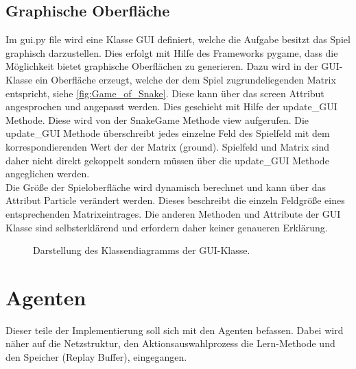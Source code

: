 \subsection{Graphische Oberfläche}
Im gui.py file wird eine Klasse GUI definiert, welche die Aufgabe besitzt das Spiel graphisch darzustellen. Dies erfolgt mit Hilfe des Frameworks pygame, dass die Möglichkeit bietet graphische Oberflächen zu generieren. Dazu wird in der GUI-Klasse ein Oberfläche erzeugt, welche der dem Spiel zugrundeliegenden Matrix entspricht, siehe \ref{fig:Game_of_Snake}. Diese kann über das screen Attribut angesprochen und angepasst werden. Dies geschieht mit Hilfe der update\_GUI Methode. Diese wird von der SnakeGame Methode view aufgerufen. Die update\_GUI Methode überschreibt jedes einzelne Feld des Spielfeld mit dem korrespondierenden Wert der der Matrix (ground). Spielfeld und Matrix sind daher nicht direkt gekoppelt sondern müssen über die update\_GUI Methode angeglichen werden.\\
Die Größe der Spieloberfläche wird dynamisch berechnet und kann über das Attribut Particle verändert werden. Dieses beschreibt die einzeln Feldgröße eines entsprechenden Matrixeintrages. Die anderen Methoden und Attribute der GUI Klasse sind selbsterklärend und erfordern daher keiner genaueren Erklärung.
\begin{figure}[H]
	\centering
	\def\svgscale{1.40}
	
	\caption[Klassendiagramm: GUI]{Darstellung des Klassendiagramms der GUI-Klasse.}
	\label{fig:GUI_class_diagram}
\end{figure}

\section{Agenten}
Dieser teile der Implementierung soll sich mit den Agenten befassen. Dabei wird näher auf die Netzstruktur, den Aktionsauswahlprozess die Lern-Methode und den Speicher (Replay Buffer), eingegangen.



